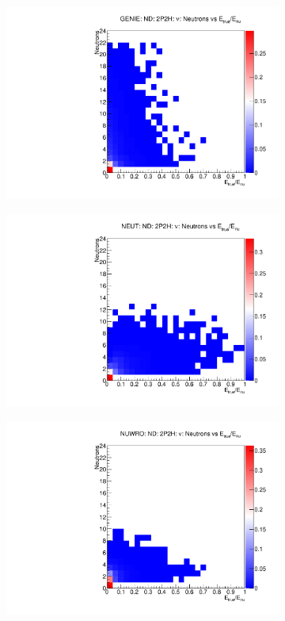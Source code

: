 \documentclass[12pt]{article}
\begin{document}
\begin{figure}
\centering
\begin{subfigure}[b]{0.32\textwidth}
  \includegraphics[width=\textwidth]{nneutrons_ene_enu/Nneutrons_Enu_true_2p2h_GENIE_ND_numu_norm.pdf}
\end{subfigure}
\begin{subfigure}[b]{0.32\textwidth}
  \includegraphics[width=\textwidth]{nneutrons_ene_enu/Nneutrons_Enu_true_2p2h_NEUT_ND_numu_norm.pdf}
\end{subfigure}
\begin{subfigure}[b]{0.32\textwidth}
  \includegraphics[width=\textwidth]{nneutrons_ene_enu/Nneutrons_Enu_true_2p2h_NUWRO_ND_numu_norm.pdf}

\end{subfigure}
\end{figure}
\end{document}
